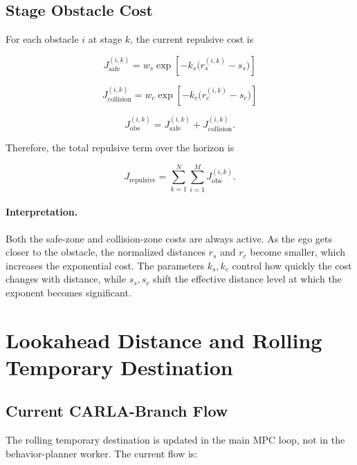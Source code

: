 \documentclass[11pt]{article}
\begin{document}
\subsection{Stage Obstacle Cost}

For each obstacle $i$ at stage $k$, the current repulsive cost is

\begin{equation}
J_{\mathrm{safe}}^{(i,k)}
=
w_s \exp\!\left[-k_s\big(r_s^{(i,k)}-s_s\big)\right]
\end{equation}

\begin{equation}
J_{\mathrm{collision}}^{(i,k)}
=
w_c \exp\!\left[-k_c\big(r_c^{(i,k)}-s_c\big)\right]
\end{equation}

\begin{equation}
J_{\mathrm{obs}}^{(i,k)}
=
J_{\mathrm{safe}}^{(i,k)}
+
J_{\mathrm{collision}}^{(i,k)}.
\end{equation}

Therefore, the total repulsive term over the horizon is

\begin{equation}
J_{\mathrm{repulsive}}
=
\sum_{k=1}^{N}\sum_{i=1}^{M} J_{\mathrm{obs}}^{(i,k)}.
\end{equation}

\paragraph{Interpretation.}
Both the safe-zone and collision-zone costs are always active. As the ego gets
closer to the obstacle, the normalized distances $r_s$ and $r_c$ become smaller,
which increases the exponential cost. The parameters $k_s,k_c$ control how
quickly the cost changes with distance, while $s_s,s_c$ shift the effective
distance level at which the exponent becomes significant.

\section{Lookahead Distance and Rolling Temporary Destination}

\subsection{Current CARLA-Branch Flow}

The rolling temporary destination is updated in the main MPC loop, not in the
behavior-planner worker. The current flow is:
\end{document}
